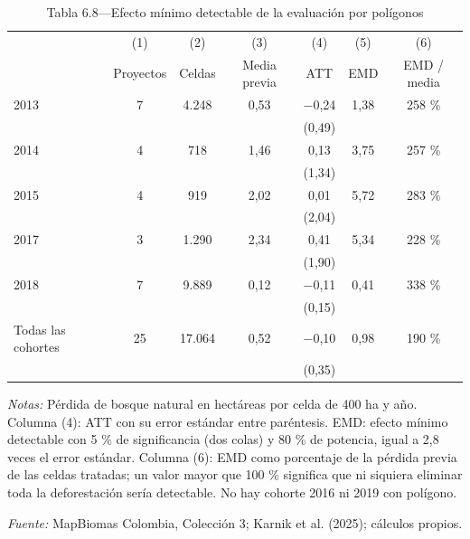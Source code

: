 \begin{table}[htbp]
\centering
\small
\caption{Tabla 6.8—Efecto mínimo detectable de la evaluación por polígonos}
\label{tab:tabla_6_8}
\begin{threeparttable}
\begin{tabular}{@{}lcccccc@{}}
\toprule
 & (1) & (2) & (3) & (4) & (5) & (6) \\
 & Proyectos & Celdas & Media previa & ATT & EMD & EMD / media \\
\midrule
2013 & 7 & 4.248 & 0,53 & $-$0,24 & 1,38 & 258 \% \\
 &  &  &  & (0,49) &  &  \\
2014 & 4 & 718 & 1,46 & 0,13 & 3,75 & 257 \% \\
 &  &  &  & (1,34) &  &  \\
2015 & 4 & 919 & 2,02 & 0,01 & 5,72 & 283 \% \\
 &  &  &  & (2,04) &  &  \\
2017 & 3 & 1.290 & 2,34 & 0,41 & 5,34 & 228 \% \\
 &  &  &  & (1,90) &  &  \\
2018 & 7 & 9.889 & 0,12 & $-$0,11 & 0,41 & 338 \% \\
 &  &  &  & (0,15) &  &  \\
\midrule
Todas las cohortes & 25 & 17.064 & 0,52 & $-$0,10 & 0,98 & 190 \% \\
 &  &  &  & (0,35) &  &  \\
\bottomrule
\end{tabular}
\begin{tablenotes}[flushleft]
\footnotesize
\item \textit{Notas:} Pérdida de bosque natural en hectáreas por celda de 400 ha y año. Columna (4): ATT con su error estándar entre paréntesis. EMD: efecto mínimo detectable con 5 \% de significancia (dos colas) y 80 \% de potencia, igual a 2,8 veces el error estándar. Columna (6): EMD como porcentaje de la pérdida previa de las celdas tratadas; un valor mayor que 100 \% significa que ni siquiera eliminar toda la deforestación sería detectable. No hay cohorte 2016 ni 2019 con polígono.
\item \textit{Fuente:} MapBiomas Colombia, Colección 3; Karnik et al. (2025); cálculos propios.
\end{tablenotes}
\end{threeparttable}
\end{table}
